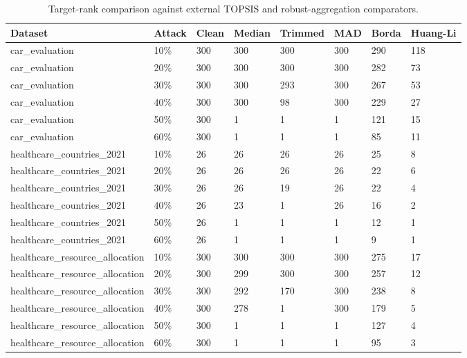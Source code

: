 \begin{table}[htbp]
\centering
\small
\caption{Target-rank comparison against external TOPSIS and robust-aggregation comparators.}
\label{tab:external_baseline_target_rank}
\begin{tabular}{llllllll}
\hline
Dataset & Attack & Clean & Median & Trimmed & MAD & Borda & Huang-Li \\
\hline
car\_evaluation & 10\% & 300 & 300 & 300 & 300 & 290 & 118 \\
car\_evaluation & 20\% & 300 & 300 & 300 & 300 & 282 & 73 \\
car\_evaluation & 30\% & 300 & 300 & 293 & 300 & 267 & 53 \\
car\_evaluation & 40\% & 300 & 300 & 98 & 300 & 229 & 27 \\
car\_evaluation & 50\% & 300 & 1 & 1 & 1 & 121 & 15 \\
car\_evaluation & 60\% & 300 & 1 & 1 & 1 & 85 & 11 \\
healthcare\_countries\_2021 & 10\% & 26 & 26 & 26 & 26 & 25 & 8 \\
healthcare\_countries\_2021 & 20\% & 26 & 26 & 26 & 26 & 22 & 6 \\
healthcare\_countries\_2021 & 30\% & 26 & 26 & 19 & 26 & 22 & 4 \\
healthcare\_countries\_2021 & 40\% & 26 & 23 & 1 & 26 & 16 & 2 \\
healthcare\_countries\_2021 & 50\% & 26 & 1 & 1 & 1 & 12 & 1 \\
healthcare\_countries\_2021 & 60\% & 26 & 1 & 1 & 1 & 9 & 1 \\
healthcare\_resource\_allocation & 10\% & 300 & 300 & 300 & 300 & 275 & 17 \\
healthcare\_resource\_allocation & 20\% & 300 & 299 & 300 & 300 & 257 & 12 \\
healthcare\_resource\_allocation & 30\% & 300 & 292 & 170 & 300 & 238 & 8 \\
healthcare\_resource\_allocation & 40\% & 300 & 278 & 1 & 300 & 179 & 5 \\
healthcare\_resource\_allocation & 50\% & 300 & 1 & 1 & 1 & 127 & 4 \\
healthcare\_resource\_allocation & 60\% & 300 & 1 & 1 & 1 & 95 & 3 \\
\hline
\end{tabular}
\end{table}
